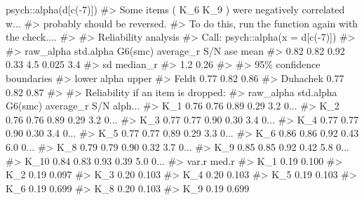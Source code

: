 \documentclass[
  letterpaper,
]{krantz}
\makeatletter
\newenvironment{Shaded}{\begin{snugshade}}{\end{snugshade}}
\newcommand{\CommentTok}[1]{\textcolor[rgb]{0.37,0.37,0.37}{#1}}
\newcommand{\DecValTok}[1]{\textcolor[rgb]{0.68,0.00,0.00}{#1}}
\newcommand{\FunctionTok}[1]{\textcolor[rgb]{0.28,0.35,0.67}{#1}}
\newcommand{\NormalTok}[1]{\textcolor[rgb]{0.00,0.23,0.31}{#1}}
\newcommand{\SpecialCharTok}[1]{\textcolor[rgb]{0.37,0.37,0.37}{#1}}
\newenvironment{kframe}{%
\medskip{}
\setlength{\fboxsep}{.8em}
 \def\at@end@of@kframe{}%
 \ifinner\ifhmode%
  \def\at@end@of@kframe{\end{minipage}}%
  \begin{minipage}{\columnwidth}%
 \fi\fi%
 \def\FrameCommand##1{\hskip\@totalleftmargin \hskip-\fboxsep
 \colorbox{shadecolor}{##1}\hskip-\fboxsep
     \hskip-\linewidth \hskip-\@totalleftmargin \hskip\columnwidth}%
 \MakeFramed {\advance\hsize-\width
   \@totalleftmargin\z@ \linewidth\hsize
   \@setminipage}}%
 {\par\unskip\endMakeFramed%
 \at@end@of@kframe}
\renewenvironment{Shaded}{\begin{kframe}}{\end{kframe}}
\makeatother
\begin{document}
\begin{Shaded}
\begin{Highlighting}[]
\NormalTok{psych}\SpecialCharTok{::}\FunctionTok{alpha}\NormalTok{(d[}\FunctionTok{c}\NormalTok{(}\SpecialCharTok{{-}}\DecValTok{7}\NormalTok{)])}
\CommentTok{\#\textgreater{} Some items ( K\_6 K\_9 ) were negatively correlated w...}
\CommentTok{\#\textgreater{} probably should be reversed.  }
\CommentTok{\#\textgreater{} To do this, run the function again with the \textquotesingle{}check....}
\CommentTok{\#\textgreater{} }
\CommentTok{\#\textgreater{} Reliability analysis   }
\CommentTok{\#\textgreater{} Call: psych::alpha(x = d[c({-}7)])}
\CommentTok{\#\textgreater{} }
\CommentTok{\#\textgreater{}   raw\_alpha std.alpha G6(smc) average\_r S/N   ase mean}
\CommentTok{\#\textgreater{}       0.82      0.82    0.92      0.33 4.5 0.025  3.4}
\CommentTok{\#\textgreater{}   sd median\_r}
\CommentTok{\#\textgreater{}  1.2     0.26}
\CommentTok{\#\textgreater{} }
\CommentTok{\#\textgreater{}     95\% confidence boundaries }
\CommentTok{\#\textgreater{}          lower alpha upper}
\CommentTok{\#\textgreater{} Feldt     0.77  0.82  0.86}
\CommentTok{\#\textgreater{} Duhachek  0.77  0.82  0.87}
\CommentTok{\#\textgreater{} }
\CommentTok{\#\textgreater{}  Reliability if an item is dropped:}
\CommentTok{\#\textgreater{}      raw\_alpha std.alpha G6(smc) average\_r S/N alph...}
\CommentTok{\#\textgreater{} K\_1       0.76      0.76    0.89      0.29 3.2    0...}
\CommentTok{\#\textgreater{} K\_2       0.76      0.76    0.89      0.29 3.2    0...}
\CommentTok{\#\textgreater{} K\_3       0.77      0.77    0.90      0.30 3.4    0...}
\CommentTok{\#\textgreater{} K\_4       0.77      0.77    0.90      0.30 3.4    0...}
\CommentTok{\#\textgreater{} K\_5       0.77      0.77    0.89      0.29 3.3    0...}
\CommentTok{\#\textgreater{} K\_6       0.86      0.86    0.92      0.43 6.0    0...}
\CommentTok{\#\textgreater{} K\_8       0.79      0.79    0.90      0.32 3.7    0...}
\CommentTok{\#\textgreater{} K\_9       0.85      0.85    0.92      0.42 5.8    0...}
\CommentTok{\#\textgreater{} K\_10      0.84      0.83    0.93      0.39 5.0    0...}
\CommentTok{\#\textgreater{}      var.r med.r}
\CommentTok{\#\textgreater{} K\_1   0.19 0.100}
\CommentTok{\#\textgreater{} K\_2   0.19 0.097}
\CommentTok{\#\textgreater{} K\_3   0.20 0.103}
\CommentTok{\#\textgreater{} K\_4   0.20 0.103}
\CommentTok{\#\textgreater{} K\_5   0.19 0.103}
\CommentTok{\#\textgreater{} K\_6   0.19 0.699}
\CommentTok{\#\textgreater{} K\_8   0.20 0.103}
\CommentTok{\#\textgreater{} K\_9   0.19 0.699}

\end{Highlighting}
\end{Shaded}
\end{document}
